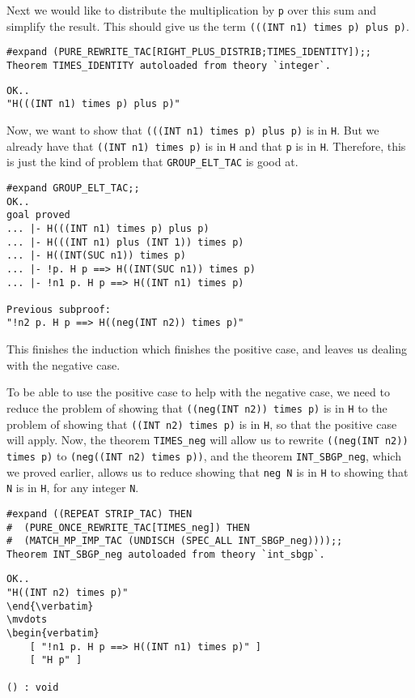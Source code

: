 Next we would like to distribute the multiplication by {\small\tt p} over
this sum and simplify the result.  This should give us the term
{\small\verb+(((INT n1) times p) plus p)+}.
\begin{session}
\begin{verbatim}
#expand (PURE_REWRITE_TAC[RIGHT_PLUS_DISTRIB;TIMES_IDENTITY]);;
Theorem TIMES_IDENTITY autoloaded from theory `integer`.
\end{verbatim}
\mvdots
\begin{verbatim}
OK..
"H(((INT n1) times p) plus p)"
\end{verbatim}
\evdots
\end{session}

Now, we want to show that {\small\verb+(((INT n1) times p) plus p)+}
is in {\small\tt H}.  But we already have that
{\small\verb+((INT n1) times p)+} is in {\small\tt H} and that
{\small\tt p} is in {\small\tt H}.  Therefore, this is just 
the kind of problem that {\small\verb+GROUP_ELT_TAC+} is good at. 
\begin{session}
\begin{verbatim}
#expand GROUP_ELT_TAC;;
OK..
goal proved
... |- H(((INT n1) times p) plus p)
... |- H(((INT n1) plus (INT 1)) times p)
... |- H((INT(SUC n1)) times p)
... |- !p. H p ==> H((INT(SUC n1)) times p)
... |- !n1 p. H p ==> H((INT n1) times p)

Previous subproof:
"!n2 p. H p ==> H((neg(INT n2)) times p)"
\end{verbatim}
\evdots
\end{session}
This finishes the induction which finishes the positive case, and
leaves us dealing with the negative case.

To be able to use the positive case to help with the negative case, we
need to reduce the problem of showing that
{\small\verb+((neg(INT n2)) times p)+} is in {\small\tt H} to the
problem of showing that {\small\verb+((INT n2) times p)+} is in
{\small\tt H}, so that the positive case will apply.  Now, the theorem
{\small\verb+TIMES_neg+} will allow us to rewrite
{\small\verb+((neg(INT n2)) times p)+} to
{\small\verb+(neg((INT n2) times p))+}, and the theorem
{\small\verb+INT_SBGP_neg+}, which we proved earlier, allows us to
reduce showing that {\small\verb+neg N+} is in {\small\tt H} to
showing that {\small\tt N} is in {\small\tt H}, for any integer 
{\small\tt N}.
\begin{session}
\begin{verbatim}
#expand ((REPEAT STRIP_TAC) THEN
#  (PURE_ONCE_REWRITE_TAC[TIMES_neg]) THEN
#  (MATCH_MP_IMP_TAC (UNDISCH (SPEC_ALL INT_SBGP_neg))));;
Theorem INT_SBGP_neg autoloaded from theory `int_sbgp`.
\end{verbatim}
\mvdots
\begin{verbatim}
OK..
"H((INT n2) times p)"
\end{\verbatim}
\mvdots
\begin{verbatim}
    [ "!n1 p. H p ==> H((INT n1) times p)" ]
    [ "H p" ]

() : void
\end{verbatim}
\end{session}

